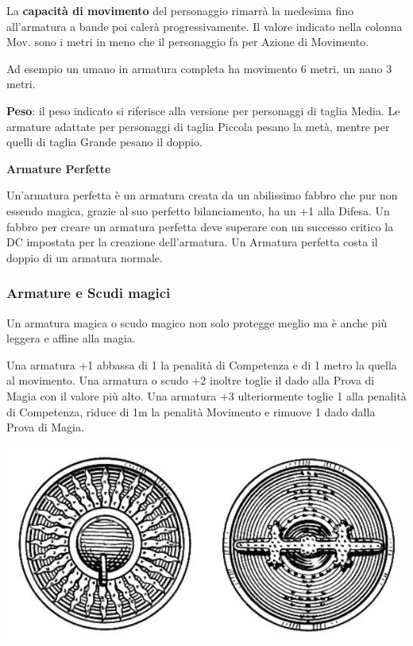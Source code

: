 \begin{multicols}{2}
La \textbf{capacità di movimento} del personaggio rimarrà la medesima fino all'armatura a bande poi calerà progressivamente. Il valore indicato nella colonna Mov. sono i metri in meno che il personaggio fa per Azione di Movimento.

Ad esempio un umano in armatura completa ha movimento 6 metri, un nano 3 metri.

\textbf{Peso}: il peso indicato si riferisce alla versione per personaggi di taglia Media. Le armature adattate per personaggi di taglia Piccola pesano la metà, mentre per quelli di taglia Grande pesano il doppio.

\textbf{Armature Perfette}

Un'armatura perfetta è un armatura creata da un abilissimo fabbro che pur non essendo magica, grazie al suo perfetto bilanciamento, ha un +1 alla Difesa. Un fabbro per creare un armatura perfetta deve superare con un successo critico la DC impostata per la creazione dell'armatura. Un Armatura perfetta costa il doppio di un armatura normale.

\subsubsection{Armature e Scudi magici}

Un armatura magica o scudo magico non solo protegge meglio ma è anche più leggera e affine alla magia.

Una armatura +1 abbassa di 1 la penalità di Competenza e di 1 metro la quella al movimento.
Una armatura o scudo +2 inoltre toglie il dado alla Prova di Magia con il valore più alto. Una armatura +3 ulteriormente toglie 1 alla penalità di Competenza, riduce di 1m la penalità Movimento e rimuove 1 dado dalla Prova di Magia.


\begin{center}
\includegraphics[width=1\linewidth]{immagini/buckler.png}


\end{center}
\end{multicols}
